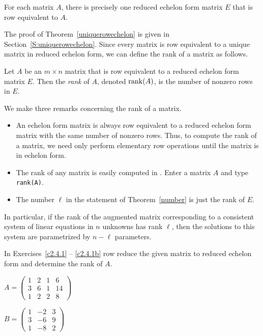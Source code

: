 \documentclass{ximera}
\begin{document}
\begin{thm} \label{uniquerowechelon}
For each matrix $A$, there is precisely one reduced echelon form
matrix $E$ that is row equivalent  to $A$.
\end{thm}

The proof of Theorem~\ref{uniquerowechelon} is given in 
Section~\ref{S:uniquerowechelon}.  Since every matrix is row equivalent 
to a unique matrix in reduced echelon form, we can define the rank 
of a matrix as follows.
\begin{Def}  \label{D:rank}
Let $A$ be an $m\times n$ matrix that is row equivalent to a
reduced echelon form matrix $E$.  Then the {\em rank\/} of $A$,
denoted ${\rm rank}(A)$, is the number of nonzero rows in $E$.
\end{Def}  

We make three remarks concerning the rank of a matrix.
\begin{itemize}
\item An echelon form matrix is always row equivalent to a
reduced echelon form matrix with the same number of nonzero
rows.  Thus, to compute the rank of a matrix, we need only
perform elementary row operations until the matrix is in echelon
form.
\item	The rank of any matrix is easily computed in \Matlabp.
Enter a matrix $A$ and type {\tt rank(A)}.
\item The number $\ell$ in the statement of Theorem~\ref{number}
is just the rank of $E$.
\end{itemize}
In particular, if the rank of the augmented matrix corresponding to
a consistent system of linear equations in $n$ unknowns has rank $\ell$,
then the solutions to this system are parametrized by $n-\ell$ parameters.


\EXER

\TEXER

\noindent In Exercises~\ref{c2.4.1} -- \ref{c2.4.1b} row reduce the given 
matrix to reduced echelon form and determine the rank of $A$.
\begin{exercise} \label{c2.4.1}
$A=\left(\begin{array}{rrrr}
1 &  2 & 1 & 6\\
3 &  6 & 1 & 14\\
1 &  2 & 2 & 8
\end{array}\right)$
\end{exercise}
\begin{exercise} \label{c2.4.1b}
$B=\left(\begin{array}{rrr}
1 &  -2 & 3\\
3 &  -6 & 9 \\
1 &  -8 & 2
\end{array}\right)$
\end{exercise}
\end{document}
